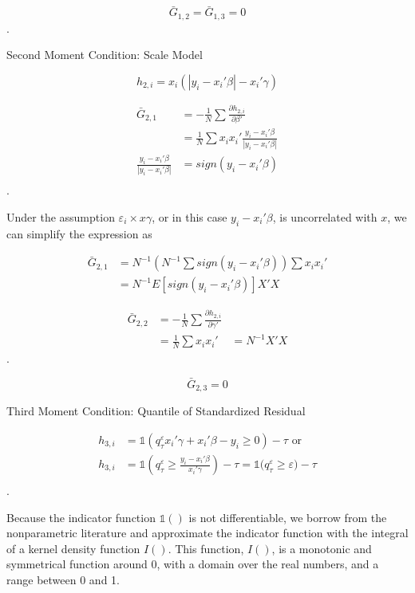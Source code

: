 \documentclass[
  authoryear,
  review,
  1p]{elsarticle}
\begin{document}
\[
\bar G_{1,2} = \bar G_{1,3} = 0
\].

Second Moment Condition: Scale Model

\[h_{2,i}=x_i(|y_i-x_i'\beta|-x_i'\gamma)\]

\[\begin{aligned}
\bar G_{2,1} &= -\frac{1}{N} \sum \frac{\partial h_{2,i}}{\partial \beta'} \\
             &=  \frac{1}{N} \sum x_i x_i' \frac{y_i-x_i'\beta}{|y_i-x_i'\beta|} \\
\frac{y_i-x_i'\beta}{|y_i-x_i'\beta|} &= sign(y_i-x_i'\beta) \\            
\end{aligned}
\].

Under the assumption \(\varepsilon_i \times x\gamma\), or in this case
\(y_i-x_i'\beta\), is uncorrelated with \(x\), we can simplify the
expression as

\[\begin{aligned}
\bar G_{2,1} &= N^{-1} \left(N^{-1}\sum sign(y_i-x_i'\beta)\right) \sum x_i x_i' \\
&= N^{-1} E[sign(y_i-x_i'\beta)] X'X
\end{aligned}
\]

\[\begin{aligned}
\bar G_{2,2} &= -\frac{1}{N} \sum \frac{\partial h_{2,i}}{\partial \gamma'} \\
             &=  \frac{1}{N} \sum x_i x_i' 
             &= N^{-1} X'X
\end{aligned}
\].

\[\bar G_{2,3}=0\]

Third Moment Condition: Quantile of Standardized Residual

\[\begin{aligned}
h_{3,i} &= \mathbb{1}\left( q^\varepsilon_\tau x_i'\gamma +x_i'\beta - y_i \geq 0 \right) - \tau \text{ or}\\
h_{3,i} &= \mathbb{1}\left( q^\varepsilon_\tau  \geq \frac{y_i- x_i'\beta}{x_i'\gamma}  \right) - \tau = \mathbb{1}\big( q^\varepsilon_\tau  \geq \varepsilon  \big) - \tau \\
\end{aligned}
\].

Because the indicator function \(\mathbb{1}()\) is not differentiable,
we borrow from the nonparametric literature and approximate the
indicator function with the integral of a kernel density function
\(I()\). This function, \(I()\), is a monotonic and symmetrical function
around 0, with a domain over the real numbers, and a range between 0
and 1.
\end{document}
